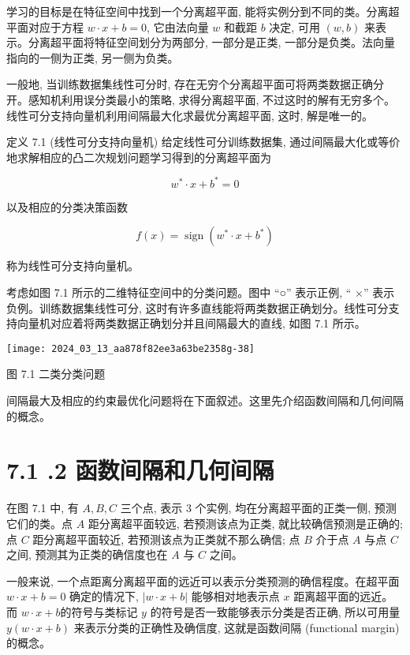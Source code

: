 \documentclass[10pt]{article}
\begin{document}
\begin{CJK*}{UTF8}{bsmi}
学习的目标是在特征空间中找到一个分离超平面, 能将实例分到不同的类。分离超平面对应于方程 $w \cdot x+b=0$, 它由法向量 $w$ 和截距 $b$ 决定, 可用 $(w, b)$ 来表示。分离超平面将特征空间划分为两部分, 一部分是正类, 一部分是负类。法向量指向的一侧为正类, 另一侧为负类。

一般地, 当训练数据集线性可分时, 存在无穷个分离超平面可将两类数据正确分开。感知机利用误分类最小的策略, 求得分离超平面, 不过这时的解有无穷多个。线性可分支持向量机利用间隔最大化求最优分离超平面, 这时, 解是唯一的。

定义 7.1 (线性可分支持向量机) 给定线性可分训练数据集, 通过间隔最大化或等价地求解相应的凸二次规划问题学习得到的分离超平面为


\begin{equation*}
w^{*} \cdot x+b^{*}=0 \tag{7.1}
\end{equation*}


以及相应的分类决策函数


\begin{equation*}
f(x)=\operatorname{sign}\left(w^{*} \cdot x+b^{*}\right) \tag{7.2}
\end{equation*}


称为线性可分支持向量机。

考虑如图 7.1 所示的二维特征空间中的分类问题。图中 “○” 表示正例, “ ×” 表示负例。训练数据集线性可分, 这时有许多直线能将两类数据正确划分。线性可分支持向量机对应着将两类数据正确划分并且间隔最大的直线, 如图 7.1 所示。

\begin{center}
\texttt{[image: 2024\_03\_13\_aa878f82ee3a63be2358g-38]}
\end{center}

图 7.1 二类分类问题

间隔最大及相应的约束最优化问题将在下面叙述。这里先介绍函数间隔和几何间隔的概念。

\section*{7.1 .2 函数间隔和几何间隔}
在图 7.1 中, 有 $A, B, C$ 三个点, 表示 3 个实例, 均在分离超平面的正类一侧, 预测它们的类。点 $A$ 距分离超平面较远, 若预测该点为正类, 就比较确信预测是正确的; 点 $C$ 距分离超平面较近, 若预测该点为正类就不那么确信; 点 $B$ 介于点 $A$ 与点 $C$ 之间, 预测其为正类的确信度也在 $A$ 与 $C$ 之间。

一般来说, 一个点距离分离超平面的远近可以表示分类预测的确信程度。在超平面 $w \cdot x+b=0$ 确定的情况下, $|w \cdot x+b|$ 能够相对地表示点 $x$ 距离超平面的远近。而 $w \cdot x+b$的符号与类标记 $y$ 的符号是否一致能够表示分类是否正确, 所以可用量 $y(w \cdot x+b)$ 来表示分类的正确性及确信度, 这就是函数间隔 (functional margin) 的概念。


\end{CJK*}
\end{document}
